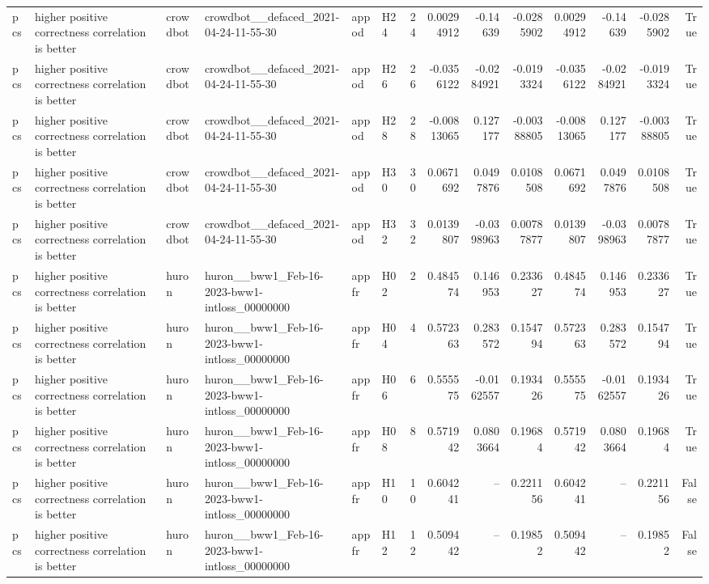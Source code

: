 \begin{longtable}{llllllrrrrrrrr}
pcs & higher positive correctness correlation is better & crowdbot & crowdbot\_\_defaced\_2021-04-24-11-55-30 & appod & H24 & 24 & 0.00294912 & -0.14639 & -0.0285902 & 0.00294912 & -0.14639 & -0.0285902 & True \\
pcs & higher positive correctness correlation is better & crowdbot & crowdbot\_\_defaced\_2021-04-24-11-55-30 & appod & H26 & 26 & -0.0356122 & -0.0284921 & -0.0193324 & -0.0356122 & -0.0284921 & -0.0193324 & True \\
pcs & higher positive correctness correlation is better & crowdbot & crowdbot\_\_defaced\_2021-04-24-11-55-30 & appod & H28 & 28 & -0.00813065 & 0.127177 & -0.00388805 & -0.00813065 & 0.127177 & -0.00388805 & True \\
pcs & higher positive correctness correlation is better & crowdbot & crowdbot\_\_defaced\_2021-04-24-11-55-30 & appod & H30 & 30 & 0.0671692 & 0.0497876 & 0.0108508 & 0.0671692 & 0.0497876 & 0.0108508 & True \\
pcs & higher positive correctness correlation is better & crowdbot & crowdbot\_\_defaced\_2021-04-24-11-55-30 & appod & H32 & 32 & 0.0139807 & -0.0398963 & 0.00787877 & 0.0139807 & -0.0398963 & 0.00787877 & True \\
pcs & higher positive correctness correlation is better & huron & huron\_\_bww1\_Feb-16-2023-bww1-intloss\_00000000 & appfr & H02 & 2 & 0.484574 & 0.146953 & 0.233627 & 0.484574 & 0.146953 & 0.233627 & True \\
pcs & higher positive correctness correlation is better & huron & huron\_\_bww1\_Feb-16-2023-bww1-intloss\_00000000 & appfr & H04 & 4 & 0.572363 & 0.283572 & 0.154794 & 0.572363 & 0.283572 & 0.154794 & True \\
pcs & higher positive correctness correlation is better & huron & huron\_\_bww1\_Feb-16-2023-bww1-intloss\_00000000 & appfr & H06 & 6 & 0.555575 & -0.0162557 & 0.193426 & 0.555575 & -0.0162557 & 0.193426 & True \\
pcs & higher positive correctness correlation is better & huron & huron\_\_bww1\_Feb-16-2023-bww1-intloss\_00000000 & appfr & H08 & 8 & 0.571942 & 0.0803664 & 0.19684 & 0.571942 & 0.0803664 & 0.19684 & True \\
pcs & higher positive correctness correlation is better & huron & huron\_\_bww1\_Feb-16-2023-bww1-intloss\_00000000 & appfr & H10 & 10 & 0.604241 & -- & 0.221156 & 0.604241 & -- & 0.221156 & False \\
pcs & higher positive correctness correlation is better & huron & huron\_\_bww1\_Feb-16-2023-bww1-intloss\_00000000 & appfr & H12 & 12 & 0.509442 & -- & 0.19852 & 0.509442 & -- & 0.19852 & False \\

\end{longtable}
